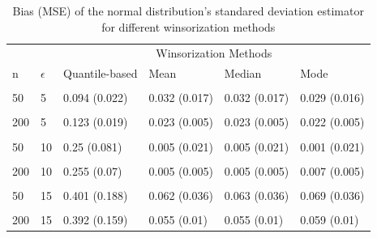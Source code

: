 \documentclass[
]{article}
\begin{document}
\begin{CodeChunk}
\begin{table}[H]

\caption{\label{tab:unnamed-chunk-5}Bias (MSE) of the normal distribution's standared deviation estimator for different winsorization methods}
\centering
\begin{tabular}[t]{l|l|l|l|l|l}
\hline
\multicolumn{2}{c|}{ } & \multicolumn{4}{c}{Winsorization  Methods} \\
\cline{3-6}
n & $\epsilon$ & Quantile-based & Mean & Median & Mode\\
\hline
\cellcolor{gray!6}{20} & \cellcolor{gray!6}{5} & \cellcolor{gray!6}{0.095 (0.047)} & \cellcolor{gray!6}{0.078 (0.05)} & \cellcolor{gray!6}{0.077 (0.05)} & \cellcolor{gray!6}{0.072 (0.049)}\\
\hline
50 & 5 & 0.094 (0.022) & 0.032 (0.017) & 0.032 (0.017) & 0.029 (0.016)\\
\hline
\cellcolor{gray!6}{100} & \cellcolor{gray!6}{5} & \cellcolor{gray!6}{0.125 (0.023)} & \cellcolor{gray!6}{0.026 (0.01)} & \cellcolor{gray!6}{0.026 (0.01)} & \cellcolor{gray!6}{0.024 (0.01)}\\
\hline
200 & 5 & 0.123 (0.019) & 0.023 (0.005) & 0.023 (0.005) & 0.022 (0.005)\\
\hline
\cellcolor{gray!6}{20} & \cellcolor{gray!6}{10} & \cellcolor{gray!6}{0.226 (0.101)} & \cellcolor{gray!6}{0.014 (0.053)} & \cellcolor{gray!6}{0.013 (0.053)} & \cellcolor{gray!6}{0.007 (0.053)}\\
\hline
50 & 10 & 0.25 (0.081) & 0.005 (0.021) & 0.005 (0.021) & 0.001 (0.021)\\
\hline
\cellcolor{gray!6}{100} & \cellcolor{gray!6}{10} & \cellcolor{gray!6}{0.252 (0.073)} & \cellcolor{gray!6}{0.006 (0.01)} & \cellcolor{gray!6}{0.006 (0.01)} & \cellcolor{gray!6}{0.009 (0.01)}\\
\hline
200 & 10 & 0.255 (0.07) & 0.005 (0.005) & 0.005 (0.005) & 0.007 (0.005)\\
\hline
\cellcolor{gray!6}{20} & \cellcolor{gray!6}{15} & \cellcolor{gray!6}{0.35 (0.183)} & \cellcolor{gray!6}{0.004 (0.064)} & \cellcolor{gray!6}{0.005 (0.064)} & \cellcolor{gray!6}{0.015 (0.065)}\\
\hline
50 & 15 & 0.401 (0.188) & 0.062 (0.036) & 0.063 (0.036) & 0.069 (0.036)\\
\hline
\cellcolor{gray!6}{100} & \cellcolor{gray!6}{15} & \cellcolor{gray!6}{0.387 (0.162)} & \cellcolor{gray!6}{0.048 (0.016)} & \cellcolor{gray!6}{0.049 (0.016)} & \cellcolor{gray!6}{0.053 (0.016)}\\
\hline
200 & 15 & 0.392 (0.159) & 0.055 (0.01) & 0.055 (0.01) & 0.059 (0.01)\\
\hline
\end{tabular}
\end{table}

\end{CodeChunk}
\end{document}
